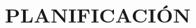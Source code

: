 \chapter[Planificación]{
  \label{chp:planificacion}
  PLANIFICACIÓN
}
\thispagestyle{numberingStyle}
\pagestyle{numberingStyle}

